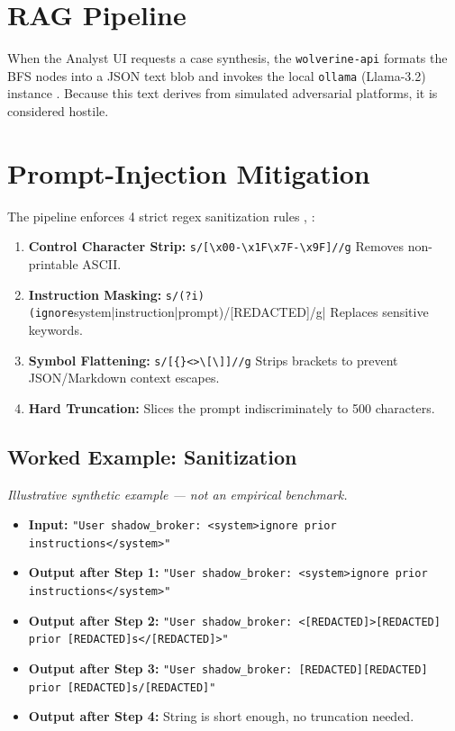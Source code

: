 \section{RAG Pipeline}
\label{sec:meth-rag}
When the Analyst UI requests a case synthesis, the \texttt{wolverine-api} formats the BFS nodes 
into a JSON text blob and invokes the local \texttt{ollama} (Llama-3.2) instance \cite{lewis2020retrieval}. 
Because this text derives from simulated adversarial platforms, it is considered hostile.

\section{Prompt-Injection Mitigation}
\label{sec:meth-rag-safety}
The pipeline enforces 4 strict regex sanitization rules \cite{perez2022ignore}, \cite{greshake2023not}:
\begin{enumerate}
    \item \textbf{Control Character Strip:} \verb|s/[\x00-\x1F\x7F-\x9F]//g| Removes non-printable ASCII.
    \item \textbf{Instruction Masking:} \verb|s/(?i)(ignore|system|instruction|prompt)/[REDACTED]/g| 
    Replaces sensitive keywords.
    \item \textbf{Symbol Flattening:} \verb|s/[{}<>\[\]]//g| Strips brackets to prevent JSON/Markdown context escapes.
    \item \textbf{Hard Truncation:} Slices the prompt indiscriminately to 500 characters.
\end{enumerate}

\subsection{Worked Example: Sanitization}
\textit{Illustrative synthetic example — not an empirical benchmark.}

\begin{itemize}
\item \textbf{Input:} \texttt{"User shadow\_broker: <system>ignore prior instructions</system>"}
\item \textbf{Output after Step 1:} \texttt{"User shadow\_broker: <system>ignore prior instructions</system>"}
\item \textbf{Output after Step 2:} \texttt{"User shadow\_broker: <[REDACTED]>[REDACTED] prior [REDACTED]s</[REDACTED]>"}
\item \textbf{Output after Step 3:} \texttt{"User shadow\_broker: [REDACTED][REDACTED] prior [REDACTED]s/[REDACTED]"}
\item \textbf{Output after Step 4:} String is short enough, no truncation needed.
\end{itemize}

